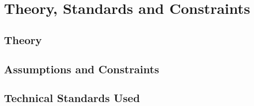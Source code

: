 \chapter{Theory, Standards and Constraints}
        \section{Theory}
        \section{Assumptions and Constraints}
        \section{Technical Standards Used}
    